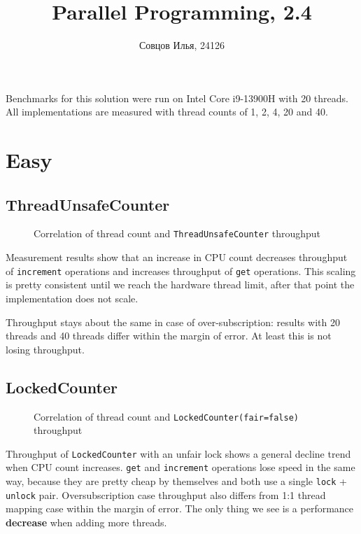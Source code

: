 \documentclass[a4paper,12pt]{article}
\title{Parallel Programming, 2.4}
\author{Совцов Илья, 24126}
\date{}
\begin{document}
\maketitle
\pagebreak

Benchmarks for this solution were run on Intel Core i9-13900H with 20 threads. All implementations are measured with thread counts of 1, 2, 4, 20 and 40.

\section*{Easy}

\subsection*{ThreadUnsafeCounter}
\begin{figure}[!htb]
\begin{center}

\cprotect\caption{Correlation of thread count and \verb|ThreadUnsafeCounter| throughput}
\end{center}
\end{figure}

Measurement results show that an increase in CPU count decreases throughput of \verb|increment| operations and increases throughput of \verb|get| operations. This scaling is pretty consistent until we reach the hardware thread limit, after that point the implementation does not scale.

Throughput stays about the same in case of over-subscription: results with 20 threads and 40 threads differ within the margin of error. At least this is not losing throughput.

\subsection*{LockedCounter}
\begin{figure}[!htb]
\begin{center}

\cprotect\caption{Correlation of thread count and \verb|LockedCounter(fair=false)| throughput}
\end{center}
\end{figure}

Throughput of \verb|LockedCounter| with an unfair lock shows a general decline trend when CPU count increases.
\verb|get| and \verb|increment| operations lose speed in the same way, because they are pretty cheap by themselves and both use a single \verb|lock| + \verb|unlock| pair. Oversubscription case throughput also differs from 1:1 thread mapping case within the margin of error. The only thing we see is a performance \textbf{decrease} when adding more threads.
\end{document}
